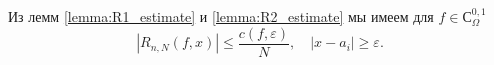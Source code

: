 Из лемм \ref{lemma:R1_estimate} и \ref{lemma:R2_estimate} мы имеем для $f \in С^{0,1}_\Omega$
\begin{equation} \label{R_estimate}
\left|R_{n,N}(f,x)\right|\leq \frac{c(f,\varepsilon)}{N}, \quad |x - a_i| \geq \varepsilon.
\end{equation}

